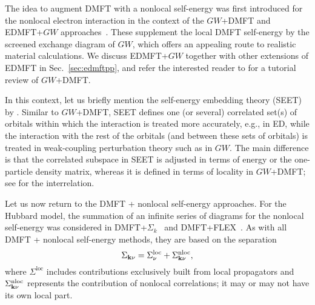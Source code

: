 \documentclass[rmp,aps,reprint,amsmath,amssymb,superscriptaddress,showpacs,nofootinbib]{revtex4-1}
\begin{document}
The idea to augment DMFT with a nonlocal self-energy was first introduced for the nonlocal electron interaction in the context of the $GW$+DMFT and EDMFT+$GW$ approaches~\cite{Sun02,Biermann2003}. These supplement the local DMFT self-energy by the screened exchange diagram of $GW$, which offers an appealing route to realistic material calculations.  We discuss EDMFT+$GW$ together with other extensions of EDMFT  in Sec.~\ref{sec:edmftpp}, and refer the interested reader to  for a tutorial review of $GW$+DMFT.

In this context, let us briefly mention the self-energy embedding theory (SEET) by . Similar to $GW$+DMFT, SEET defines one (or several) correlated set(s) of orbitals within which the interaction is treated more accurately, e.g., in ED, while the interaction with the rest of the orbitals (and between these sets of orbitals)  is treated in weak-coupling perturbation theory such as in $GW$. The main difference is that the correlated subspace in SEET is adjusted in terms of energy or the one-particle density matrix, whereas it is defined in terms of locality in  $GW$+DMFT; see  for the interrelation.

Let us now return to the DMFT + nonlocal self-energy approaches. For  the Hubbard model, the summation of an infinite series of diagrams for the nonlocal self-energy was considered in DMFT+$\Sigma_{k}$~\cite{Sadovskii2005,Kuchinskii2005,Kuchinskii2006} and DMFT+FLEX~\cite{Gukelberger2015,Kitatani2015}. As with all  DMFT + nonlocal self-energy methods, they are based on the separation
\begin{equation}
\label{Eq:SigmaNonloc}
  \Sigma _{\mathbf{k}\nu }=\Sigma ^{\mathrm{loc}}_\nu+\Sigma^{\rm nloc}_{%
  \mathbf{k}\nu },
\end{equation}%
where $\Sigma^{\text{loc}}$ includes contributions exclusively built from local propagators and $\Sigma^{\rm nloc}_{\mathbf{k}\nu }$ represents the contribution of nonlocal correlations; it may or may not have its own local part.
\end{document}
